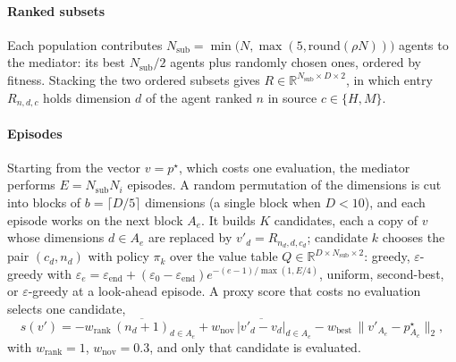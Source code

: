 \documentclass[11pt]{article}
\theoremstyle{definition}
\theoremstyle{remark}
\begin{document}
\paragraph{Ranked subsets} Each population contributes
$N_\mathrm{sub}=\min\bigl(N,\max(5,\mathrm{round}(\rho N))\bigr)$ agents to the mediator: its best $N_\mathrm{sub}/2$
agents plus randomly chosen ones, ordered by fitness. Stacking the two ordered subsets gives
$R\in\mathbb{R}^{N_\mathrm{sub}\times D\times 2}$, in which entry $R_{n,d,c}$ holds dimension $d$ of the agent ranked
$n$ in source $c\in\{H,M\}$.

\paragraph{Episodes} Starting from the vector $v=p^\star$, which costs one evaluation, the mediator performs
$E=N_\mathrm{sub}N_i$ episodes. A random permutation of the dimensions is cut into blocks of $b=\lceil D/5\rceil$
dimensions (a single block when $D<10$), and each episode works on the next block $A_e$. It builds $K$ candidates, each a
copy of $v$ whose dimensions $d\in A_e$ are replaced by $v'_d = R_{n_d,d,c_d}$; candidate $k$ chooses the pair
$(c_d,n_d)$ with policy $\pi_k$ over the value table
$Q\in\mathbb{R}^{D\times N_\mathrm{sub}\times 2}$: greedy, $\varepsilon$-greedy with
$\varepsilon_e=\varepsilon_\mathrm{end}+(\varepsilon_0-\varepsilon_\mathrm{end})e^{-(e-1)/\max(1,E/4)}$, uniform,
second-best, or $\varepsilon$-greedy at a look-ahead episode. A proxy score that costs no evaluation selects one
candidate,
\begin{equation}
s(v') = -w_\mathrm{rank}\,\overline{(n_d+1)}_{d\in A_e} + w_\mathrm{nov}\,\overline{|v'_d-v_d|}_{d\in A_e}
        - w_\mathrm{best}\,\|v'_{A_e}-p^\star_{A_e}\|_2,
\label{eq:proxy}
\end{equation}
with $w_\mathrm{rank}=1$, $w_\mathrm{nov}=0.3$, and only that candidate is evaluated.
\end{document}
